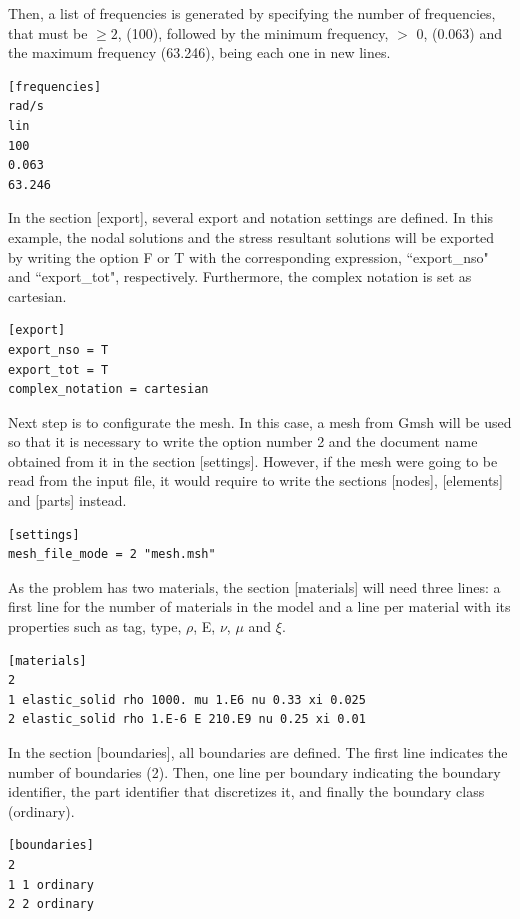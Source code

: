\documentclass[a4]{article}
\begin{document}
Then, a list of frequencies is generated by specifying the number of frequencies, that must be $\geq 2$, (100), followed by the minimum frequency, $>$ 0, (0.063) and the maximum frequency (63.246), being each one in new lines.

\begin{Verbatim}
[frequencies]
rad/s
lin
100
0.063
63.246
\end{Verbatim}

In the section [export], several export and notation settings are defined. In this example, the nodal solutions and the stress resultant solutions will be exported by writing the option F or T with the corresponding expression, ``export\_nso" and ``export\_tot", respectively. Furthermore, the complex notation is set as cartesian. 

\begin{Verbatim}
[export]
export_nso = T
export_tot = T
complex_notation = cartesian
\end{Verbatim}

Next step is to configurate the mesh. In this case, a mesh from Gmsh will be used so that it is necessary to write the option number 2 and the document name obtained from it in the section [settings]. However, if the mesh were going to be read from the input file, it would require to write the sections [nodes], [elements] and [parts] instead.

\begin{Verbatim}	
[settings]
mesh_file_mode = 2 "mesh.msh"
\end{Verbatim}

As the problem has two materials, the section [materials] will need three lines: a first line for the number of materials in the model and a line per material with its properties such as tag, type, $\rho$, E, $\nu$, $\mu$ and $ \xi $.

\begin{Verbatim}
[materials]
2
1 elastic_solid rho 1000. mu 1.E6 nu 0.33 xi 0.025
2 elastic_solid rho 1.E-6 E 210.E9 nu 0.25 xi 0.01
\end{Verbatim}

In the section [boundaries], all boundaries are defined. The first line indicates the number of boundaries (2). Then, one line per boundary indicating the boundary identifier, the part identifier that discretizes it, and finally the boundary class (ordinary).

\begin{Verbatim}
[boundaries]
2
1 1 ordinary
2 2 ordinary
\end{Verbatim}
\end{document}
